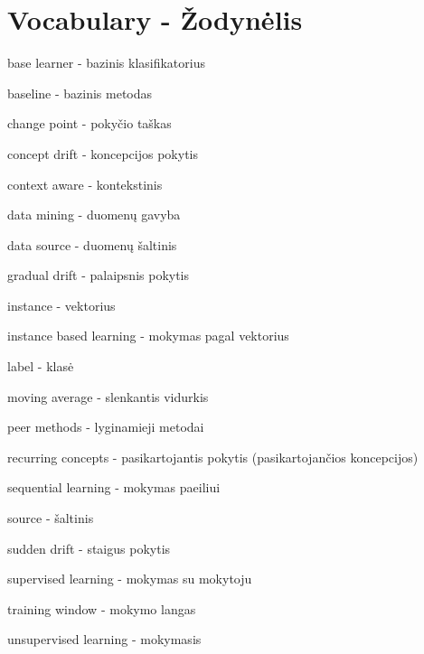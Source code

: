 	

\chapter*{Vocabulary - \v{Z}odyn\.elis}
\label{cha:zodynas}

\begin{compactitem}[]
\item base learner - bazinis klasifikatorius 
\item baseline - bazinis metodas 
\item change point - poky\v{c}io ta\v{s}kas 
\item concept drift - koncepcijos pokytis
\item context aware - kontekstinis 
\item data mining - duomen\k{u} gavyba 
\item data source - duomen\k{u} \v{s}altinis
\item gradual drift - palaipsnis pokytis 
\item instance - vektorius
\item instance based learning - mokymas pagal vektorius 
\item label - klas\.e
\item moving average - slenkantis vidurkis 
\item peer methods - lyginamieji metodai 
\item recurring concepts - pasikartojantis pokytis (pasikartojan\v{c}ios koncepcijos)
\item sequential learning - mokymas paeiliui
\item source - \v{s}altinis
\item sudden drift - staigus pokytis
\item supervised learning - mokymas su mokytoju
\item training window - mokymo langas 
\item unsupervised learning - mokymasis 
\end{compactitem}


